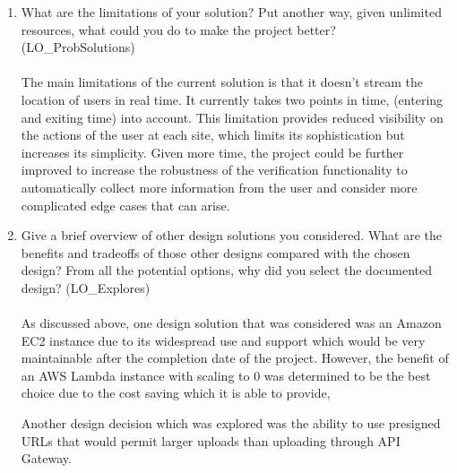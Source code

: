 \documentclass[12pt, titlepage]{article}
\begin{document}
\begin{enumerate}
    \item What are the limitations of your solution?  Put another way, given
      unlimited resources, what could you do to make the project
      better? (LO\_ProbSolutions)
      \\
      \\
      The main limitations of the current solution is that it doesn't
      stream the location of users in real time.
      It currently takes two points in time, (entering and exiting
      time) into account. This limitation provides reduced visibility
      on the actions of the user at each site,
      which limits its sophistication but increases its simplicity.
      Given more time, the project could be further improved to
      increase the robustness of the verification
      functionality to automatically collect more information from the
      user and consider more complicated edge cases that can arise.

    \item Give a brief overview of other design solutions you considered.  What
      are the benefits and tradeoffs of those other designs compared
      with the chosen
      design?  From all the potential options, why did you select the
      documented design?
      (LO\_Explores)
      \\
      \\
      As discussed above, one design solution that was considered was
      an Amazon EC2 instance due to its widespread use and support
      which would be very maintainable
      after the completion date of the project. However, the benefit of
      an AWS Lambda instance with scaling to 0 was determined to be the
      best choice due to the cost
      saving which it is able to provide,

      Another design decision which was explored was the ability to use
      presigned URLs that would permit larger uploads than uploading
      through API Gateway.
  \end{enumerate}

  
\end{document}
